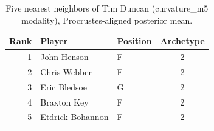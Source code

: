 \begin{table}[htbp]
  \centering\small
  \begin{tabular}{rllc}
    \toprule
    Rank & Player & Position & Archetype \\
    \midrule
    1 & John Henson & F & 2 \\
    2 & Chris Webber & F & 2 \\
    3 & Eric Bledsoe & G & 2 \\
    4 & Braxton Key & F & 2 \\
    5 & Etdrick Bohannon & F & 2 \\
    \bottomrule
  \end{tabular}
  \caption{Five nearest neighbors of Tim Duncan (curvature_m5 modality), Procrustes-aligned posterior mean.}
  \label{tab:Tim_Duncan_neighbors_curvature_m5}
\end{table}

